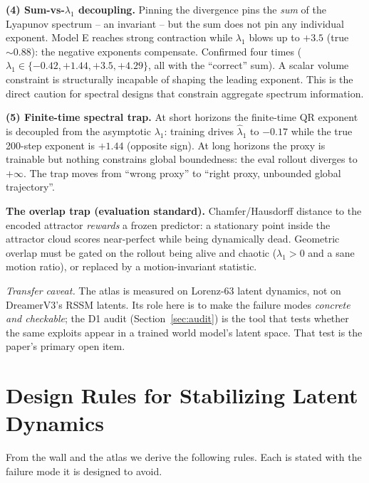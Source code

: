 \documentclass[journal]{IEEEtran}
\begin{document}
\textbf{(4) Sum-vs-$\lambda_1$ decoupling.} Pinning the divergence pins the
\emph{sum} of the Lyapunov spectrum -- an invariant -- but the sum does not
pin any individual exponent. Model E reaches strong contraction while
$\lambda_1$ blows up to $+3.5$ (true $\sim0.88$): the negative exponents
compensate. Confirmed four times ($\lambda_1 \in \{-0.42, +1.44, +3.5,
+4.29\}$, all with the ``correct'' sum). A scalar volume constraint is
structurally incapable of shaping the leading exponent. This is the direct
caution for spectral designs that constrain aggregate spectrum information.

\textbf{(5) Finite-time spectral trap.} At short horizons the finite-time QR
exponent is decoupled from the asymptotic $\lambda_1$: training drives
$\hat\lambda_1$ to $-0.17$ while the true 200-step exponent is $+1.44$
(opposite sign). At long horizons the proxy is trainable but nothing
constrains global boundedness: the eval rollout diverges to $+\infty$. The
trap moves from ``wrong proxy'' to ``right proxy, unbounded global
trajectory''.

\textbf{The overlap trap (evaluation standard).} Chamfer/Hausdorff distance to
the encoded attractor \emph{rewards} a frozen predictor: a stationary point
inside the attractor cloud scores near-perfect while being dynamically dead.
Geometric overlap must be gated on the rollout being alive and chaotic
($\lambda_1 > 0$ and a sane motion ratio), or replaced by a
motion-invariant statistic.

\emph{Transfer caveat.} The atlas is measured on Lorenz-63 latent dynamics,
not on DreamerV3's RSSM latents. Its role here is to make the failure modes
\emph{concrete and checkable}; the D1 audit (Section~\ref{sec:audit}) is the
tool that tests whether the same exploits appear in a trained world model's
latent space. That test is the paper's primary open item.

\section{Design Rules for Stabilizing Latent Dynamics}
\label{sec:rules}

From the wall and the atlas we derive the following rules. Each is stated
with the failure mode it is designed to avoid.
\end{document}
